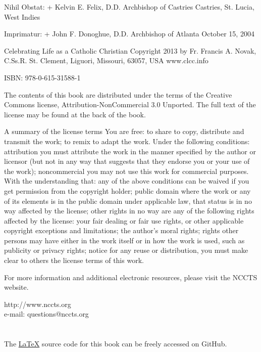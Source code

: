 \documentclass[oneside]{book}
\begin{document}
{\small
Nihil Obstat: + Kelvin E. Felix, D.D.  Archbishop of Castries Castries,
St. Lucia, West Indies

Imprimatur: + John F. Donoghue, D.D.  Archbishop of Atlanta October 15, 2004

Celebrating Life as a Catholic Christian Copyright 2013 by Fr. Francis A. Novak,
C.Ss.R.  St. Clement, Liguori, Missouri, 63057, USA www.clcc.info

ISBN: 978-0-615-31588-1

The contents of this book are distributed under the terms of the Creative
Commons license, Attribution-NonCommercial 3.0 Unported. The full text of the
license may be found at the back of the book.

A summary of the license terms You are free: to share to copy, distribute and
transmit the work; to remix to adapt the work. Under the following conditions:
attribution you must attribute the work in the manner specified by the author or
licensor (but not in any way that suggests that they endorse you or your use of
the work); noncommercial you may not use this work for commercial purposes. With
the understanding that: any of the above conditions can be waived if you get
permission from the copyright holder; public domain where the work or any of its
elements is in the public domain under applicable law, that status is in no way
affected by the license; other rights in no way are any of the following rights
affected by the license: your fair dealing or fair use rights, or other
applicable copyright exceptions and limitations; the author's moral rights;
rights other persons may have either in the work itself or in how the work is
used, such as publicity or privacy rights; notice for any reuse or distribution,
you must make clear to others the license terms of this work.

For more information and additional electronic resources, please visit the NCCTS
website.

\begin{center}
http://www.nccts.org \\
e-mail: questions@nccts.org
\end{center}

\section*{}
\begin{center}

The \href{http://www.latex-project.org/}{\LaTeX} source code for this book can
be freely accessed on GitHub.


\end{center}}
\end{document}
